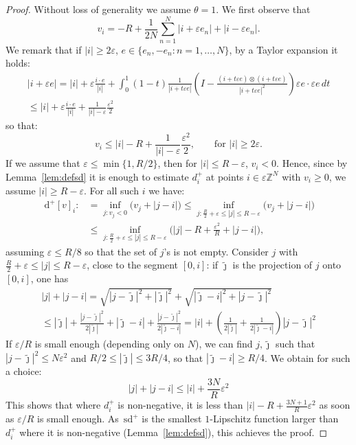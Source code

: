 \documentclass[10pt]{amsart}
\theoremstyle{plain}
\theoremstyle{definition}
\newcommand{\Z}{\mathbb{Z}}
\newcommand{\e}{\varepsilon}
\newcommand{\ud}{\,\mathrm{d}}
\newcommand{\sd}{\,\mathrm{sd}}
\newcommand{\ez}{\e\Z^N}
\numberwithin{equation}{section}
\begin{document}
\begin{proof}
  Without loss of generality we assume $\theta=1$. 
  We first observe that
  \[
    v_i = -R + \frac{1}{2N}\sum_{n=1}^N |i+\e e_n|+ |i-\e e_n|.
  \]
  We remark that if $|i|\ge 2\e$, $e\in\{e_n,-e_n:n= 1,\dots ,N\}$,
   {by a   Taylor expansion it holds:}
  \begin{multline}\label{eq:Taylor}
    |i+\e e| = |i| + \e\frac{i\cdot e}{|i|} +
    \int_0^1 (1-t) \frac{1}{|i+t\e e|}\left(I - \frac{(i+t\e e)\otimes (i+t\e e)}{|i+t\e e|^2}
    \right)\e e \cdot \e e\,dt  \\ 
    \le  |i| + \e\frac{i\cdot e}{|i|} + \frac{1}{|i|-\e}\frac{\e^2}{2}
  \end{multline}
  so that:
  \[
    v_i \le |i|-R + \frac{1}{|i|-\e}\frac{\e^2}{2}, \qquad  {\text{for } |i|\ge 2\e}.
  \]
  If we assume that $\e\le \min\{1,R/2\}$, then for $|i|\le R-\e$,
  $v_i< 0$. Hence, since by Lemma~\ref{lem:defsd}
  it is enough
  to estimate $d_i^+$ at points
  $i\in\ez$ with $v_i\ge 0$, we assume  $|i|\ge R-\e$. For all such $i$ we have:
  \begin{equation}
  \begin{split}\label{eq:d+est}
      \ud^+[v]_i :&= \inf_{j:v_j<0}  {(} v_j + |j-i|  {)}
    \le \inf_{j: \frac{R}{2}+\e\le |j|\le R-\e}  {(} v_j + |j-i|  {)} \\
    &\le \inf_{j: \frac{R}{2}+\e \le |j|\le R-\e}  {(} |j|-R + \frac{\e^2}{R} + |j-i|  ),
  \end{split}
  \end{equation}
  assuming $\e\le R/8$ so that the set of $j$'s is not empty.
  Consider $j$ with $\frac{R}{2}+\e \le |j|\le R-\e$, close to the
  segment $[0,i]$:  if $\tilde{\jmath}$ is the projection of $j$ onto $[0,i]$, one has
  \begin{multline*}
    |j|+|j-i| =  \sqrt{ |j-\tilde{\jmath}|^2 +|\tilde{\jmath}|^2} + \sqrt{|\tilde{\jmath}-i|^2+|j-\tilde{\jmath}|^2}
    \\
    \le |\tilde{\jmath}| + \frac{|j-\tilde{\jmath}|^2 }{2|\tilde{\jmath}|}
    + |\tilde{\jmath}-i| + \frac{|j-\tilde{\jmath}|^2 }{2|\tilde{\jmath}-i|}
    = |i| + \left(\frac{1}{2|\tilde{\jmath}|} + \frac{1}{2|\tilde{\jmath}-i|} \right){|j-\tilde{\jmath}|^2 }
  \end{multline*}
  If $\e/R$ is small enough (depending only on $N$), we can find
  $j,\tilde{\jmath}$ such that $|j-\tilde{\jmath}|^2\le N\e^2$ and $R/2\le |\tilde{\jmath}|\le 3R/4$,
  so that $|\tilde{\jmath}-i|\ge R/4$. We obtain for such a choice:
\begin{equation}\label{eq:triangle}
    |j|+|j-i| \le |i|+\frac{3N}{R}\e^2
\end{equation}
  This shows that where $d^+_i$ is non-negative, it is
  less than $|i|-R + \frac{3N+1}{R}\e^2$ as soon as $\e/R$ is small enough. As $\sd^+$ is the smallest
  $1$-Lipschitz function larger than $d^+_i$ where it is non-negative (Lemma~\ref{lem:defsd}),
  this achieves the proof.
\end{proof}
\end{document}
